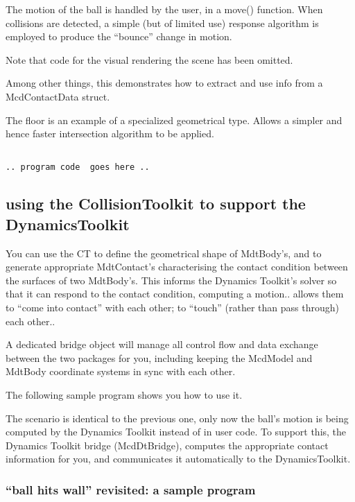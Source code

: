 \documentclass[11pt]{article}
\begin{document}
The motion of the ball is handled by the user, in a move() function. When
collisions are detected, a simple (but of limited use) response algorithm
is employed to produce the ``bounce'' change in motion.

Note that code for the visual rendering the scene has been omitted.

Among other things, this demonstrates how to extract and use info from a McdContactData struct.

The floor is an example of a specialized geometrical type. Allows
a simpler and hence faster intersection algorithm to be applied.

\begin{verbatim}

.. program code  goes here ..

\end{verbatim}

\subsection{ using the CollisionToolkit to support the DynamicsToolkit }

You can use the CT to define the geometrical
shape of MdtBody's, and to generate appropriate MdtContact's 
characterising the contact condition between the surfaces of two MdtBody's.  
This informs the Dynamics Toolkit's solver so that it can respond to the contact
condition, computing a motion..
allows them to ``come into contact'' with each other; to ``touch'' (rather
than pass through) each other..

A dedicated bridge object will manage all control flow and data exchange
between the two packages for you, including keeping the McdModel and MdtBody
coordinate systems in sync with each other. 

The following sample program shows you how to use it. 

The scenario is
identical to the previous one, only now the ball's motion is
being computed by the Dynamics Toolkit instead of in user code. To
support this, the Dynamics Toolkit bridge (McdDtBridge), computes the
appropriate contact information for you, and communicates it automatically to the
DynamicsToolkit.

\subsubsection{ ``ball hits wall'' revisited: a sample program }
\end{document}
